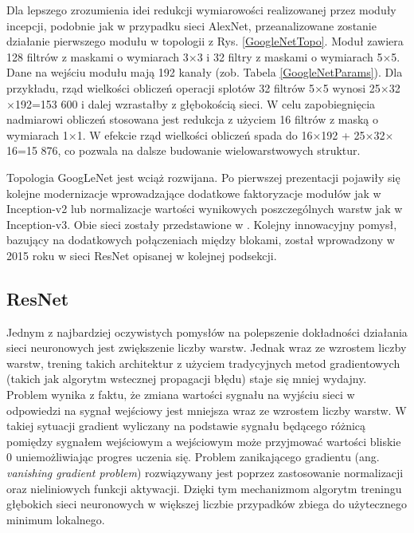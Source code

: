 Dla lepszego zrozumienia idei redukcji wymiarowości realizowanej przez moduły incepcji, podobnie jak w przypadku sieci AlexNet, przeanalizowane zostanie działanie pierwszego modułu w topologii z Rys. \ref{GoogleNetTopo}.
Moduł zawiera 128 filtrów z maskami o wymiarach 3$\times$3 i 32 filtry z maskami o wymiarach 5$\times$5. Dane na wejściu modułu mają 192 kanały (zob. Tabela \ref{GoogleNetParams}). Dla przykładu, rząd wielkości obliczeń operacji splotów 32 filtrów 5$\times$5 wynosi 25$\times$32$\times$192=153 600 i dalej wzrastałby z głębokością sieci. W celu zapobiegnięcia nadmiarowi obliczeń stosowana jest redukcja z użyciem 16 filtrów z maską o wymiarach 1$\times$1. W efekcie rząd wielkości obliczeń spada do 16$\times$192 +  25$\times$32$\times$16=15 876, co pozwala na dalsze budowanie wielowarstwowych struktur.

Topologia GoogLeNet jest wciąż rozwijana. Po pierwszej prezentacji pojawiły się kolejne modernizacje wprowadzające dodatkowe faktoryzacje modułów jak w Inception-v2 lub normalizacje wartości wynikowych poszczególnych warstw jak w Inception-v3. Obie sieci zostały przedstawione w \cite{DBLP:journals/corr/SzegedyVISW15}. Kolejny innowacyjny pomysł, bazujący na dodatkowych połączeniach między blokami, został wprowadzony w 2015 roku w sieci ResNet opisanej w kolejnej podsekcji.

\subsection{ResNet}

Jednym z najbardziej oczywistych pomysłów na polepszenie dokładności działania sieci neuronowych jest zwiększenie liczby warstw. Jednak wraz ze wzrostem liczby warstw, trening takich architektur z użyciem tradycyjnych metod gradientowych (takich jak algorytm wstecznej propagacji błędu) staje się mniej wydajny. Problem wynika z faktu, że zmiana wartości sygnału na wyjściu sieci w odpowiedzi na sygnał wejściowy jest mniejsza wraz ze wzrostem liczby warstw. W takiej sytuacji gradient wyliczany na podstawie sygnału będącego różnicą pomiędzy sygnałem wejściowym a wejściowym może przyjmować wartości bliskie 0 uniemożliwiając progres uczenia się. Problem zanikającego gradientu (ang. \textit{vanishing gradient problem}) rozwiązywany jest poprzez zastosowanie normalizacji oraz nieliniowych funkcji aktywacji. Dzięki tym mechanizmom algorytm treningu głębokich sieci neuronowych w większej liczbie przypadków zbiega do użytecznego minimum lokalnego. 

